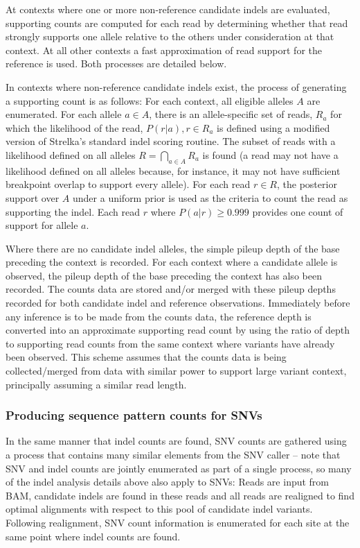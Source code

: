 \documentclass{article}
\begin{document}
At contexts where one or more non-reference candidate indels are evaluated, supporting counts are computed for each read by determining whether that read strongly supports one allele relative to the others under consideration at that context. At all other contexts a fast approximation of read support for the reference is used. Both processes are detailed below.

In contexts where non-reference candidate indels exist, the process of generating a supporting count is as follows: For each context, all eligible alleles $A$ are enumerated. For each allele $a \in A$, there is an allele-specific set of reads, $R_a$ for which the likelihood of the read, $P( r \vert a ), r \in R_a$ is defined using a modified version of Strelka's standard indel scoring routine. The subset of reads with a likelihood defined on all alleles $R = \bigcap_{a \in A} R_a$ is found (a read may not have a likelihood defined on all alleles because, for instance, it may not have sufficient breakpoint overlap to support every allele). For each read $r \in R$, the posterior support over $A$ under a uniform prior is used as the criteria to count the read as supporting the indel. Each read $r$ where $P( a \vert r ) \geq 0.999$ provides one count of support for allele $a$.

Where there are no candidate indel alleles, the simple pileup depth of the base preceding the context is recorded. For each context where a candidate allele is observed, the pileup depth of the base preceding the context has also been recorded. The counts data are stored and/or merged with these pileup depths recorded for both candidate indel and reference observations. Immediately before any inference is to be made from the counts data, the reference depth is converted into an approximate supporting read count by using the ratio of depth to supporting read counts from the same context where variants have already been observed. This scheme assumes that the counts data is being collected/merged from data with similar power to support large variant context, principally assuming a similar read length.

\subsubsection{Producing sequence pattern counts for SNVs}

In the same manner that indel counts are found, SNV counts are gathered using a process that contains many similar elements from the SNV caller -- note that SNV and indel counts are jointly enumerated as part of a single process, so many of the indel analysis details above also apply to SNVs: Reads are input from BAM, candidate indels are found in these reads and all reads are realigned to find optimal alignments with respect to this pool of candidate indel variants. Following realignment, SNV count information is enumerated for each site at the same point where indel counts are found.
\end{document}
